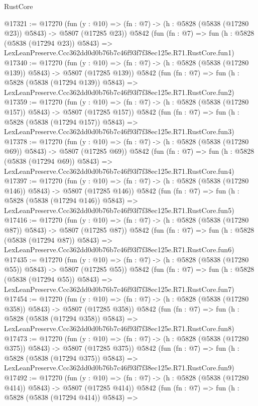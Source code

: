 \begin{lexlean}{RustCore}
\begin{coremodule}
@17321 := @17270
    (fun (y : @10) => (fn : @7) -> (h : @5828 (@5838 (@17280 @23)) @5843) -> @5807 (@17285 @23))
    @5842
    (fun (fn : @7) =>
    fun (h : @5828 (@5838 (@17294 @23)) @5843) =>
    LexLeanPreserve.Ccc362dd0d0b76b7c46f93f7f38ec125e.R71.RustCore.fun1)
@17340 := @17270
    (fun (y : @10) => (fn : @7) -> (h : @5828 (@5838 (@17280 @139)) @5843) -> @5807 (@17285 @139))
    @5842
    (fun (fn : @7) =>
    fun (h : @5828 (@5838 (@17294 @139)) @5843) =>
    LexLeanPreserve.Ccc362dd0d0b76b7c46f93f7f38ec125e.R71.RustCore.fun2)
@17359 := @17270
    (fun (y : @10) => (fn : @7) -> (h : @5828 (@5838 (@17280 @157)) @5843) -> @5807 (@17285 @157))
    @5842
    (fun (fn : @7) =>
    fun (h : @5828 (@5838 (@17294 @157)) @5843) =>
    LexLeanPreserve.Ccc362dd0d0b76b7c46f93f7f38ec125e.R71.RustCore.fun3)
@17378 := @17270
    (fun (y : @10) => (fn : @7) -> (h : @5828 (@5838 (@17280 @69)) @5843) -> @5807 (@17285 @69))
    @5842
    (fun (fn : @7) =>
    fun (h : @5828 (@5838 (@17294 @69)) @5843) =>
    LexLeanPreserve.Ccc362dd0d0b76b7c46f93f7f38ec125e.R71.RustCore.fun4)
@17397 := @17270
    (fun (y : @10) => (fn : @7) -> (h : @5828 (@5838 (@17280 @146)) @5843) -> @5807 (@17285 @146))
    @5842
    (fun (fn : @7) =>
    fun (h : @5828 (@5838 (@17294 @146)) @5843) =>
    LexLeanPreserve.Ccc362dd0d0b76b7c46f93f7f38ec125e.R71.RustCore.fun5)
@17416 := @17270
    (fun (y : @10) => (fn : @7) -> (h : @5828 (@5838 (@17280 @87)) @5843) -> @5807 (@17285 @87))
    @5842
    (fun (fn : @7) =>
    fun (h : @5828 (@5838 (@17294 @87)) @5843) =>
    LexLeanPreserve.Ccc362dd0d0b76b7c46f93f7f38ec125e.R71.RustCore.fun6)
@17435 := @17270
    (fun (y : @10) => (fn : @7) -> (h : @5828 (@5838 (@17280 @55)) @5843) -> @5807 (@17285 @55))
    @5842
    (fun (fn : @7) =>
    fun (h : @5828 (@5838 (@17294 @55)) @5843) =>
    LexLeanPreserve.Ccc362dd0d0b76b7c46f93f7f38ec125e.R71.RustCore.fun7)
@17454 := @17270
    (fun (y : @10) => (fn : @7) -> (h : @5828 (@5838 (@17280 @358)) @5843) -> @5807 (@17285 @358))
    @5842
    (fun (fn : @7) =>
    fun (h : @5828 (@5838 (@17294 @358)) @5843) =>
    LexLeanPreserve.Ccc362dd0d0b76b7c46f93f7f38ec125e.R71.RustCore.fun8)
@17473 := @17270
    (fun (y : @10) => (fn : @7) -> (h : @5828 (@5838 (@17280 @375)) @5843) -> @5807 (@17285 @375))
    @5842
    (fun (fn : @7) =>
    fun (h : @5828 (@5838 (@17294 @375)) @5843) =>
    LexLeanPreserve.Ccc362dd0d0b76b7c46f93f7f38ec125e.R71.RustCore.fun9)
@17492 := @17270
    (fun (y : @10) => (fn : @7) -> (h : @5828 (@5838 (@17280 @414)) @5843) -> @5807 (@17285 @414))
    @5842
    (fun (fn : @7) =>
    fun (h : @5828 (@5838 (@17294 @414)) @5843) =>

\end{coremodule}
\end{lexlean}
